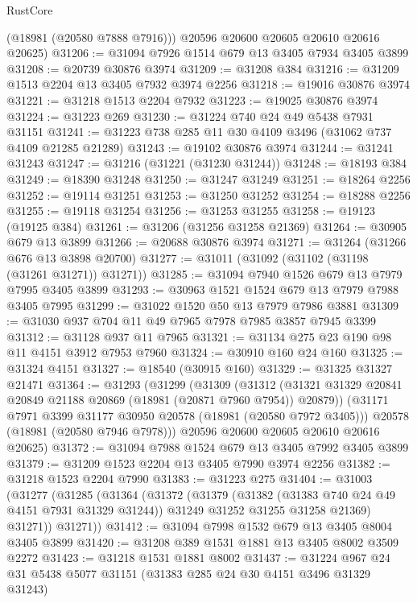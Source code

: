 \begin{lexlean}{RustCore}
\begin{coremodule}
        (@18981 (@20580 @7888 @7916)))
      @20596
      @20600
      @20605
      @20610
      @20616
      @20625)
@31206 := @31094 @7926 @1514 @679 @13 @3405 @7934 @3405 @3899
@31208 := @20739 @30876 @3974
@31209 := @31208 @384
@31216 := @31209 @1513 @2204 @13 @3405 @7932 @3974 @2256
@31218 := @19016 @30876 @3974
@31221 := @31218 @1513 @2204 @7932
@31223 := @19025 @30876 @3974
@31224 := @31223 @269
@31230 := @31224 @740 @24 @49 @5438 @7931 @31151
@31241 := @31223 @738 @285 @11 @30 @4109 @3496 (@31062 @737 @4109 @21285 @21289)
@31243 := @19102 @30876 @3974
@31244 := @31241 @31243
@31247 := @31216 (@31221 (@31230 @31244))
@31248 := @18193 @384
@31249 := @18390 @31248
@31250 := @31247 @31249
@31251 := @18264 @2256
@31252 := @19114 @31251
@31253 := @31250 @31252
@31254 := @18288 @2256
@31255 := @19118 @31254
@31256 := @31253 @31255
@31258 := @19123 (@19125 @384)
@31261 := @31206 (@31256 @31258 @21369)
@31264 := @30905 @679 @13 @3899
@31266 := @20688 @30876 @3974
@31271 := @31264 (@31266 @676 @13 @3898 @20700)
@31277 := @31011 (@31092 (@31102 (@31198 (@31261 @31271)) @31271))
@31285 := @31094 @7940 @1526 @679 @13 @7979 @7995 @3405 @3899
@31293 := @30963 @1521 @1524 @679 @13 @7979 @7988 @3405 @7995
@31299 := @31022 @1520 @50 @13 @7979 @7986 @3881
@31309 := @31030 @937 @704 @11 @49 @7965 @7978 @7985 @3857 @7945 @3399
@31312 := @31128 @937 @11 @7965
@31321 := @31134 @275 @23 @190 @98 @11 @4151 @3912 @7953 @7960
@31324 := @30910 @160 @24 @160
@31325 := @31324 @4151
@31327 := @18540 (@30915 @160)
@31329 := @31325 @31327 @21471
@31364 := @31293
    (@31299
      (@31309
        (@31312 (@31321 @31329 @20841 @20849 @21188 @20869 (@18981 (@20871 @7960 @7954)) @20879))
        (@31171 @7971 @3399 @31177 @30950 @20578 (@18981 (@20580 @7972 @3405)))
        @20578
        (@18981 (@20580 @7946 @7978)))
      @20596
      @20600
      @20605
      @20610
      @20616
      @20625)
@31372 := @31094 @7988 @1524 @679 @13 @3405 @7992 @3405 @3899
@31379 := @31209 @1523 @2204 @13 @3405 @7990 @3974 @2256
@31382 := @31218 @1523 @2204 @7990
@31383 := @31223 @275
@31404 := @31003
    (@31277
      (@31285
        (@31364
          (@31372
            (@31379
              (@31382 (@31383 @740 @24 @49 @4151 @7931 @31329 @31244))
              @31249
              @31252
              @31255
              @31258
              @21369)
            @31271))
        @31271))
@31412 := @31094 @7998 @1532 @679 @13 @3405 @8004 @3405 @3899
@31420 := @31208 @389 @1531 @1881 @13 @3405 @8002 @3509 @2272
@31423 := @31218 @1531 @1881 @8002
@31437 := @31224 @967 @24 @31 @5438 @5077 @31151 (@31383 @285 @24 @30 @4151 @3496 @31329 @31243)

\end{coremodule}
\end{lexlean}
